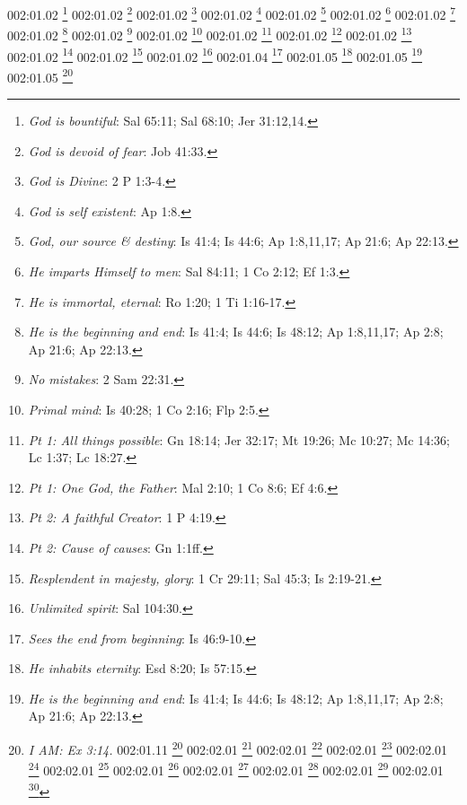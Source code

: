 {{{{{{{{002:01.02 \footnote{\textit{God is bountiful}: Sal 65:11; Sal 68:10; Jer 31:12,14.}
002:01.02 \footnote{\textit{God is devoid of fear}: Job 41:33.}
002:01.02 \footnote{\textit{God is Divine}: 2 P 1:3-4.}
002:01.02 \footnote{\textit{God is self existent}: Ap 1:8.}
002:01.02 \footnote{\textit{God, our source & destiny}: Is 41:4; Is 44:6; Ap 1:8,11,17; Ap 21:6; Ap 22:13.}
002:01.02 \footnote{\textit{He imparts Himself to men}: Sal 84:11; 1 Co 2:12; Ef 1:3.}
002:01.02 \footnote{\textit{He is immortal, eternal}: Ro 1:20; 1 Ti 1:16-17.}
002:01.02 \footnote{\textit{He is the beginning and end}: Is 41:4; Is 44:6; Is 48:12; Ap 1:8,11,17; Ap 2:8; Ap 21:6; Ap 22:13.}
002:01.02 \footnote{\textit{No mistakes}: 2 Sam 22:31.}
002:01.02 \footnote{\textit{Primal mind}: Is 40:28; 1 Co 2:16; Flp 2:5.}
002:01.02 \footnote{\textit{Pt 1: All things possible}: Gn 18:14; Jer 32:17; Mt 19:26; Mc 10:27; Mc 14:36; Lc 1:37; Lc 18:27.}
002:01.02 \footnote{\textit{Pt 1: One God, the Father}: Mal 2:10; 1 Co 8:6; Ef 4:6.}
002:01.02 \footnote{\textit{Pt 2: A faithful Creator}: 1 P 4:19.}
002:01.02 \footnote{\textit{Pt 2: Cause of causes}: Gn 1:1ff.}
002:01.02 \footnote{\textit{Resplendent in majesty, glory}: 1 Cr 29:11; Sal 45:3; Is 2:19-21.}
002:01.02 \footnote{\textit{Unlimited spirit}: Sal 104:30.}
002:01.04 \footnote{\textit{Sees the end from beginning}: Is 46:9-10.}
002:01.05 \footnote{\textit{He inhabits eternity}: Esd 8:20; Is 57:15.}
002:01.05 \footnote{\textit{He is the beginning and end}: Is 41:4; Is 44:6; Is 48:12; Ap 1:8,11,17; Ap 2:8; Ap 21:6; Ap 22:13.}
002:01.05 \footnote{\textit{I AM: Ex 3:14.}
002:01.11 \footnote{\textit{In Him we live & move}: Hch 17:28.}
002:02.01 \footnote{\textit{Declares end from beginning}: Is 46:10.}
002:02.01 \footnote{\textit{Eternal life}: Dn 12:2; Mt 19:16,29; Mt 25:46; Mc 10:17,30; Lc 10:25; Lc 18:18,30; Jn 3:15-16,36; Jn 4:14,36; Jn 5:24,39; Jn 6:27,40,47; Jn 6:54,68; Jn 8:51-52; Jn 10:28; Jn 11:25-26; Jn 12:25,50; Jn 17:2-3; Hch 13:46-48; Ro 2:7; Ro 5:21; Ro 6:22-23; Gl 6:8; 1 Ti 1:16; 1 Ti 6:12,19; Tit 1:2; Tit 3:7; 1 Jn 1:2; 1 Jn 2:25; 1 Jn 3:15; 1 Jn 5:13,20; Jud 1:21; Ap 22:5.}
002:02.01 \footnote{\textit{Eternal purpose}: Ef 3:11.}
002:02.01 \footnote{\textit{Father of lights}: Stg 1:17.}
002:02.01 \footnote{\textit{Gives to all life}: Hch 17:25.}
002:02.01 \footnote{\textit{God is changeless}: Is 25:1; Mal 3:6.}
002:02.01 \footnote{\textit{I am Lord, change not}: Mal 3:6.}
002:02.01 \footnote{\textit{My counsel shall stand}: Is 46:10.}
002:02.01 \footnote{\textit{No varibleness, changing}: Stg 1:17.}
002:02.01 \footnote{\textit{Pt 1: God has life in himself}: Jn 5:26.}
}}}}}}}}}
